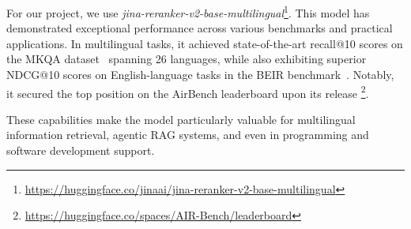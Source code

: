 For our project, we use \textit{jina-reranker-v2-base-multilingual}\footnote{\url{https://huggingface.co/jinaai/jina-reranker-v2-base-multilingual}}.
This model has demonstrated exceptional performance across various benchmarks and practical applications.
In multilingual tasks, it achieved state-of-the-art recall@10 scores on the MKQA dataset~\cite{mkqa} spanning 26 languages, while also exhibiting superior NDCG@10 scores on English-language tasks in the BEIR benchmark~\cite{thakur2021beirheterogenousbenchmarkzeroshot}.
Notably, it secured the top position on the AirBench leaderboard upon its release \footnote{\url{https://huggingface.co/spaces/AIR-Bench/leaderboard}}.

These capabilities make the model particularly valuable for multilingual information retrieval, agentic RAG systems, and even in programming and software development support.
